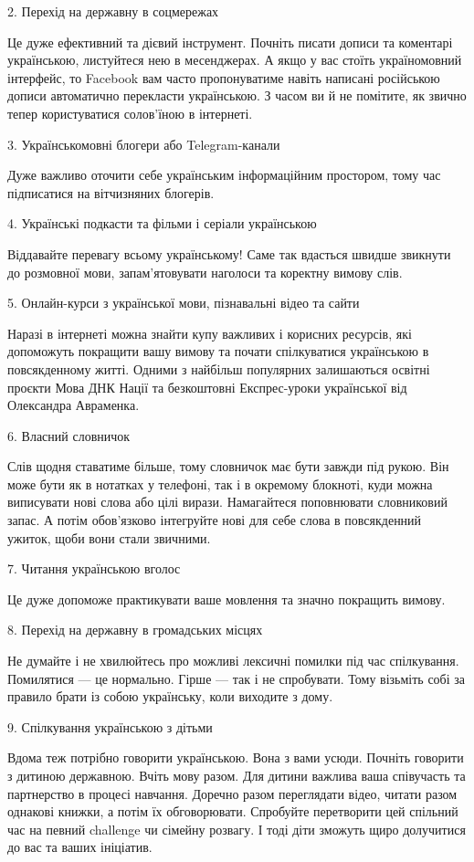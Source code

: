 2. Перехід на державну в соцмережах

Це дуже ефективний та дієвий інструмент. Почніть писати дописи та коментарі
українською, листуйтеся нею в месенджерах. А якщо у вас стоїть україномовний
інтерфейс, то Facebook вам часто пропонуватиме навіть написані російською
дописи автоматично перекласти українською. З часом ви й не помітите, як звично
тепер користуватися солов'їною в інтернеті.

3. Українськомовні блогери або Telegram-канали

Дуже важливо оточити себе українським інформаційним простором, тому час
підписатися на вітчизняних блогерів.

4. Українські подкасти та фільми і серіали українською

Віддавайте перевагу всьому українському! Саме так вдасться швидше звикнути до
розмовної мови, запам'ятовувати наголоси та коректну вимову слів.

5. Онлайн-курси з української мови, пізнавальні відео та сайти

Наразі в інтернеті можна знайти купу важливих і корисних ресурсів, які
допоможуть покращити вашу вимову та почати спілкуватися українською в
повсякденному житті. Одними з найбільш популярних залишаються освітні проєкти
Мова ДНК Нації та безкоштовні Експрес-уроки української від Олександра
Авраменка.

6. Власний словничок

Слів щодня ставатиме більше, тому словничок має бути завжди під рукою. Він може
бути як в нотатках у телефоні, так і в окремому блокноті, куди можна виписувати
нові слова або цілі вирази. Намагайтеся поповнювати словниковий запас. А потім
обов'язково інтегруйте нові для себе слова в повсякденний ужиток, щоби вони
стали звичними.

7. Читання українською вголос

Це дуже допоможе практикувати ваше мовлення та значно покращить вимову.

8. Перехід на державну в громадських місцях

Не думайте і не хвилюйтесь про можливі лексичні помилки під час спілкування.
Помилятися — це нормально. Гірше — так і не спробувати. Тому візьміть собі за
правило брати із собою українську, коли виходите з дому.

9. Спілкування українською з дітьми

Вдома теж потрібно говорити українською. Вона з вами усюди. Почніть говорити з
дитиною державною. Вчіть мову разом. Для дитини важлива ваша співучасть та
партнерство в процесі навчання. Доречно разом переглядати відео, читати разом
однакові книжки, а потім їх обговорювати. Спробуйте перетворити цей спільний
час на певний challenge чи сімейну розвагу. І тоді діти зможуть щиро долучитися
до вас та ваших ініціатив.

